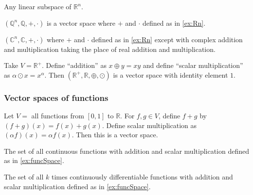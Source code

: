 \documentclass[compress]{beamer}
\def\R{\mathbb{R}}
\theoremstyle{definition}
\begin{document}
\begin{frame}
  \begin{example}
    Any linear subspace of $\R^n$.
  \end{example}
  
  \begin{example}
    $(\mathbb{Q}^n, \mathbb{Q}, +, \cdot)$ is a vector space
    where $+$ and $\cdot$ defined as in \ref{ex:Rn}.
  \end{example}
  
  \begin{example}
    $(\mathbb{C}^n, \mathbb{C}, +, \cdot)$ where $+$ and $\cdot$ defined
    as in \ref{ex:Rn} except with complex addition and multiplication
    taking the place of real addition and multiplication. 
  \end{example}
\end{frame}

\begin{frame}
  \begin{example}
    Take $V = \R^+$. Define ``addition'' as $x \oplus y = xy$ and define
    ``scalar multiplication'' as $\alpha \odot x = x^\alpha$. Then
    $(\R^+,\R, \oplus, \odot)$ is a vector space with identity element
    $1$.   
  \end{example}
\end{frame}

\begin{frame}\frametitle{Vector spaces of functions}
  \begin{example} \label{ex:funcSpace}
    Let $V = $ all functions from $[0,1]$ to $\R$. For $f, g \in V$,
    define $f + g$ by $(f+g)(x) = f(x) + g(x)$. Define scalar
    multiplication as $(\alpha f)(x) = \alpha f(x)$. Then this is a
    vector space. 
  \end{example}
  
  \begin{example}
    The set of all continuous functions with addition and scalar
    multiplication defined as in \ref{ex:funcSpace}.
  \end{example}
  
  \begin{example}
    The set of all $k$ times continuously differentiable functions with
    addition and scalar multiplication defined as in \ref{ex:funcSpace}.
  \end{example}
\end{frame}  
\end{document}
